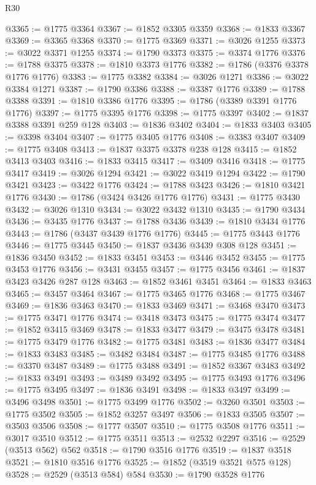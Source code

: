 \begin{lexlean}{R30}
\begin{coremodule}
@3365 := @1775 @3364
@3367 := @1852 @3305 @3359
@3368 := @1833 @3367
@3369 := @3365 @3368
@3370 := @1775 @3369
@3371 := @3026 @1255
@3373 := @3022 @3371 @1255
@3374 := @1790 @3373
@3375 := @3374 @1776
@3376 := @1788 @3375
@3378 := @1810 @3373 @1776
@3382 := @1786 (@3376 @3378 @1776 @1776)
@3383 := @1775 @3382
@3384 := @3026 @1271
@3386 := @3022 @3384 @1271
@3387 := @1790 @3386
@3388 := @3387 @1776
@3389 := @1788 @3388
@3391 := @1810 @3386 @1776
@3395 := @1786 (@3389 @3391 @1776 @1776)
@3397 := @1775 @3395 @1776
@3398 := @1775 @3397
@3402 := @1837 @3388 @3391 @259 @128
@3403 := @1836 @3402
@3404 := @1833 @3403
@3405 := @3398 @3404
@3407 := @1775 @3405 @1776
@3408 := @3383 @3407
@3409 := @1775 @3408
@3413 := @1837 @3375 @3378 @238 @128
@3415 := @1852 @3413 @3403
@3416 := @1833 @3415
@3417 := @3409 @3416
@3418 := @1775 @3417
@3419 := @3026 @1294
@3421 := @3022 @3419 @1294
@3422 := @1790 @3421
@3423 := @3422 @1776
@3424 := @1788 @3423
@3426 := @1810 @3421 @1776
@3430 := @1786 (@3424 @3426 @1776 @1776)
@3431 := @1775 @3430
@3432 := @3026 @1310
@3434 := @3022 @3432 @1310
@3435 := @1790 @3434
@3436 := @3435 @1776
@3437 := @1788 @3436
@3439 := @1810 @3434 @1776
@3443 := @1786 (@3437 @3439 @1776 @1776)
@3445 := @1775 @3443 @1776
@3446 := @1775 @3445
@3450 := @1837 @3436 @3439 @308 @128
@3451 := @1836 @3450
@3452 := @1833 @3451
@3453 := @3446 @3452
@3455 := @1775 @3453 @1776
@3456 := @3431 @3455
@3457 := @1775 @3456
@3461 := @1837 @3423 @3426 @287 @128
@3463 := @1852 @3461 @3451
@3464 := @1833 @3463
@3465 := @3457 @3464
@3467 := @1775 @3465 @1776
@3468 := @1775 @3467
@3469 := @1836 @3463
@3470 := @1833 @3469
@3471 := @3468 @3470
@3473 := @1775 @3471 @1776
@3474 := @3418 @3473
@3475 := @1775 @3474
@3477 := @1852 @3415 @3469
@3478 := @1833 @3477
@3479 := @3475 @3478
@3481 := @1775 @3479 @1776
@3482 := @1775 @3481
@3483 := @1836 @3477
@3484 := @1833 @3483
@3485 := @3482 @3484
@3487 := @1775 @3485 @1776
@3488 := @3370 @3487
@3489 := @1775 @3488
@3491 := @1852 @3367 @3483
@3492 := @1833 @3491
@3493 := @3489 @3492
@3495 := @1775 @3493 @1776
@3496 := @1775 @3495
@3497 := @1836 @3491
@3498 := @1833 @3497
@3499 := @3496 @3498
@3501 := @1775 @3499 @1776
@3502 := @3260 @3501
@3503 := @1775 @3502
@3505 := @1852 @3257 @3497
@3506 := @1833 @3505
@3507 := @3503 @3506
@3508 := @1777 @3507
@3510 := @1775 @3508 @1776
@3511 := @3017 @3510
@3512 := @1775 @3511
@3513 := @2532 @2297
@3516 := @2529 (@3513 @562) @562
@3518 := @1790 @3516 @1776
@3519 := @1837 @3518
@3521 := @1810 @3516 @1776
@3525 := @1852 (@3519 @3521 @575 @128)
@3528 := @2529 (@3513 @584) @584
@3530 := @1790 @3528 @1776

\end{coremodule}
\end{lexlean}
